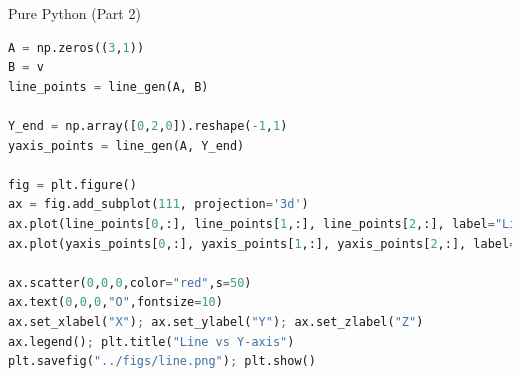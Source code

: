 \documentclass{beamer}
\begin{document}
\begin{frame}[fragile]{Pure Python (Part 2)}
\begin{lstlisting}[language=Python]
A = np.zeros((3,1))
B = v
line_points = line_gen(A, B)

Y_end = np.array([0,2,0]).reshape(-1,1)
yaxis_points = line_gen(A, Y_end)

fig = plt.figure()
ax = fig.add_subplot(111, projection='3d')
ax.plot(line_points[0,:], line_points[1,:], line_points[2,:], label="Line")
ax.plot(yaxis_points[0,:], yaxis_points[1,:], yaxis_points[2,:], label="Y-axis")

ax.scatter(0,0,0,color="red",s=50)
ax.text(0,0,0,"O",fontsize=10)
ax.set_xlabel("X"); ax.set_ylabel("Y"); ax.set_zlabel("Z")
ax.legend(); plt.title("Line vs Y-axis")
plt.savefig("../figs/line.png"); plt.show()
\end{lstlisting}
\end{frame}
\end{document}
